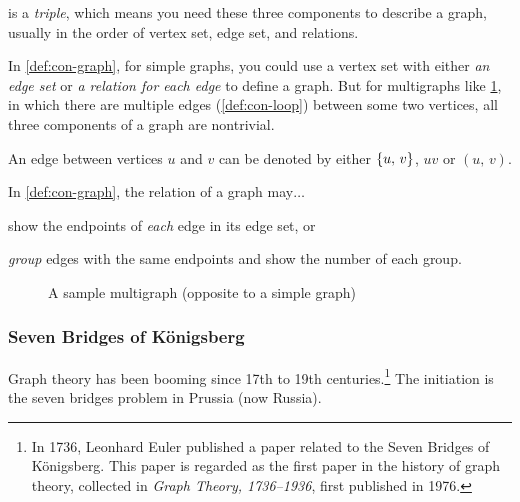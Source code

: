 \documentclass[../src/handouts/main.tex]{subfiles}
\begin{document}
 is a \textit{triple}, which means you need these three components to describe a graph, usually in the order of vertex set, edge set, and relations.

In \cref{def:con-graph}, for simple graphs, you could use a vertex set with either \textit{an edge set} or \textit{a relation for each edge} to define a graph. But for multigraphs like \cref{fig:con-graph}, in which there are multiple edges (\cref{def:con-loop}) between some two vertices, all three components of a graph are nontrivial.

An edge between vertices $u$ and $v$ can be denoted by either $\lbrace u,\, v \rbrace$, $uv$ or $\left( u,\, v \right)$.

In \cref{def:con-graph}, the relation of a graph may$\ldots$
\begin{enumerate*}
  \item show the endpoints of \textit{each} edge in its edge set, or
  \item \textit{group} edges with the same endpoints and show the number of each group.
\end{enumerate*}

\begin{figure}[ht]
  \centering
  \caption{A sample multigraph (opposite to a simple graph)}
  \label{fig:con-graph}
\end{figure}

\subsubsection{Seven Bridges of Königsberg}\label{subsubsec:con-seven-bridges}

Graph theory has been booming since 17th to 19th centuries.\footnote{In 1736, Leonhard Euler published a paper related to the Seven Bridges of Königsberg. This paper is regarded as the first paper in the history of graph theory, collected in \textit{Graph Theory, 1736--1936}, first published in 1976.} The initiation is the seven bridges problem in Prussia (now Russia).
\end{document}
